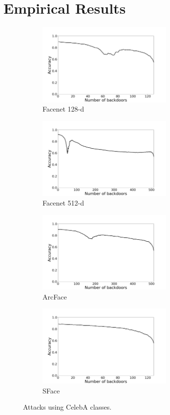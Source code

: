 \documentclass{article}
\theoremstyle{plain}
\theoremstyle{definition}
\theoremstyle{remark}
\begin{document}
\section{Empirical Results}
\label{Empirical Results}
    \begin{figure}[t!]
    \centering
    \begin{subfigure}[t]{0.45\textwidth}
        \centering
        \includegraphics[height=1.6in]{figures/celeba_attack_Facenet_opencv_cosine_128.png}
        \caption{Facenet 128-d}
    \end{subfigure}%
    \hfill 
    \begin{subfigure}[t]{0.45\textwidth}
        \centering
        \includegraphics[height=1.6in]{figures/celeba_attack_Facenet512_opencv_cosine_512.png}
        \caption{Facenet 512-d}
    \end{subfigure}
    \hfill 
    \begin{subfigure}[t]{0.45\textwidth}
        \centering
        \includegraphics[height=1.6in]{figures/celeba_attack_ArcFace_opencv_cosine_512.png}
        \caption{ArcFace}
    \end{subfigure}
    \hfill 
    \begin{subfigure}[t]{0.45\linewidth}
        \centering
        \includegraphics[height=1.6in]{figures/celeba_attack_SFace_opencv_cosine_128.png}
        \caption{SFace}
    \end{subfigure}
    \caption{Attacks using CelebA classes.}
\end{figure}
\end{document}
